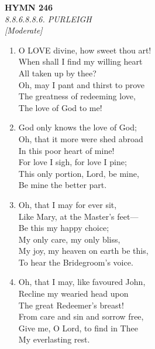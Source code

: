 \newpage
\begin{center}
    {\Large \textbf{HYMN 246}}
    \\
    \textit{8.8.6.8.8.6. PURLEIGH}
    \\
    \textit{\small [Moderate]}
\end{center}
\vspace{1em}

\begin{enumerate}
    \item O LOVE divine, how sweet thou art! \\
        When shall I find my willing heart \\
            All taken up by thee? \\
        Oh, may I pant and thirst to prove \\
        The greatness of redeeming love, \\
            The love of God to me!

    \item God only knows the love of God; \\
        Oh, that it more were shed abroad \\
            In this poor heart of mine! \\
        For love I sigh, for love I pine; \\
        This only portion, Lord, be mine, \\
            Be mine the better part.

    \item Oh, that I may for ever sit, \\
        Like Mary, at the Master's feet--- \\
            Be this my happy choice; \\
        My only care, my only bliss, \\
        My joy, my heaven on earth be this, \\
            To hear the Bridegroom's voice.

    \item Oh, that I may, like favoured John, \\
        Recline my wearied head upon \\
            The great Redeemer's breast! \\
        From care and sin and sorrow free, \\
        Give me, O Lord, to find in Thee \\
            My everlasting rest.

\end{enumerate}

